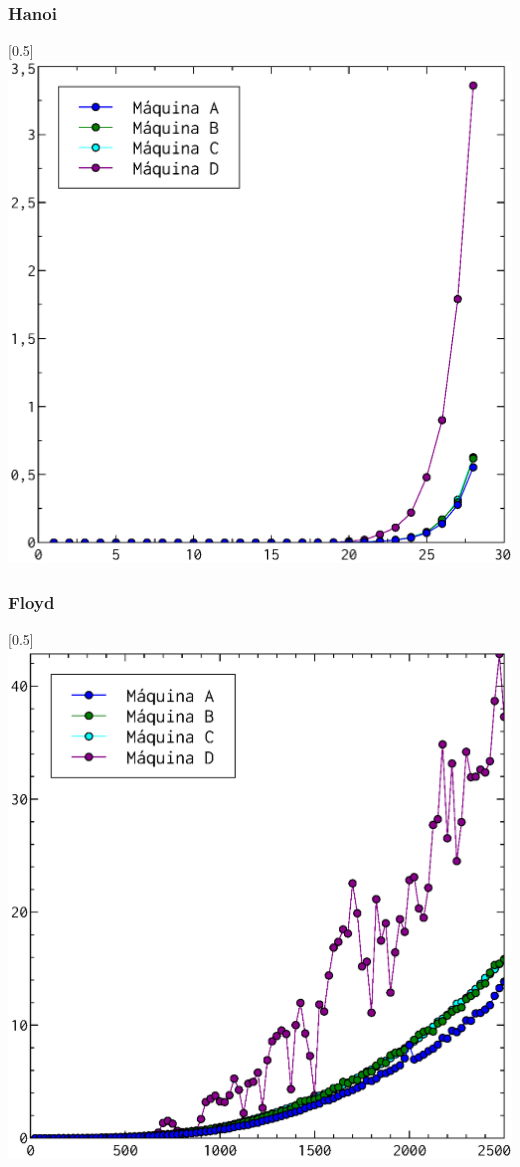 \documentclass[compress]{beamer}
\begin{document}
\begin{frame}
\frametitle{Hanoi}
	\begin{center}
\scalebox{0.53}[0.5]{
    \includegraphics[]{hanoi_todos.eps}
}
\end{center}
\end{frame}

\begin{frame}
\frametitle{Floyd}
	\begin{center}
\scalebox{0.53}[0.5]{
    \includegraphics[]{floyd_todos.eps}
}
\end{center}
\end{frame}
\end{document}
